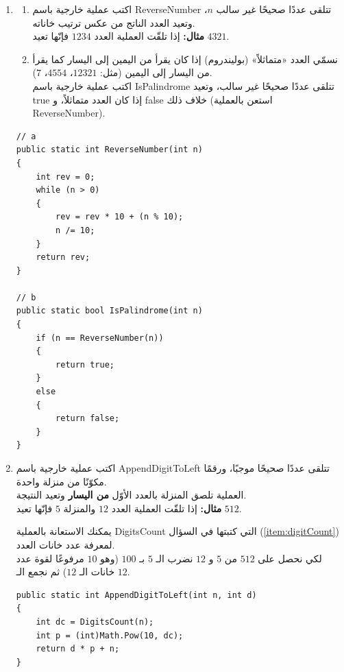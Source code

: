 \documentclass[14pt]{extarticle}
\begin{document}
\begin{enumerate}[itemsep=2em]
\item
\begin{enumerate}
    \item اكتب عملية خارجية باسم \textenglish{ReverseNumber} تتلقى عددًا صحيحًا غير سالب $n$، وتعيد العدد الناتج من عكس ترتيب خاناته. \\
    \textbf{مثال:} إذا تلقّت العملية العدد $1234$ فإنّها تعيد $4321$.
    \item نسمّي العدد «متماثلاً» (بوليندروم) إذا كان يقرأ من اليمين إلى اليسار كما يقرأ من اليسار إلى اليمين (مثل: $12321$، $4554$، $7$). \\
    اكتب عملية خارجية باسم \textenglish{IsPalindrome} تتلقى عددًا صحيحًا غير سالب، وتعيد \textenglish{true} إذا كان العدد متماثلاً، و \textenglish{false} خلاف ذلك (استعن بالعملية \textenglish{ReverseNumber}).
\end{enumerate}
\ifwithsols
\begin{boxSolution}
\begin{english}
\begin{verbatim}
// a
public static int ReverseNumber(int n)
{
    int rev = 0;
    while (n > 0)
    {
        rev = rev * 10 + (n % 10);
        n /= 10;
    }
    return rev;
}

// b
public static bool IsPalindrome(int n)
{
    if (n == ReverseNumber(n))
    {
        return true;
    }
    else
    {
        return false;
    }
}
\end{verbatim}
\end{english}
\end{boxSolution}
\fi
\filbreak

\item \label{item:appendDigitToLeft}
اكتب عملية خارجية باسم \textenglish{AppendDigitToLeft} تتلقى عددًا صحيحًا موجبًا، ورقمًا مكوّنًا من منزلة واحدة. \\
العملية تلصق المنزلة بالعدد الأوّل \textbf{من اليسار} وتعيد النتيجة. \\
\textbf{مثال:} إذا تلقّت العملية العدد $12$ والمنزلة $5$ فإنّها تعيد $512$.
\begin{boxHint}
يمكنك الاستعانة بالعملية \textenglish{DigitsCount} التي كتبتها في السؤال (\ref{item:digitCount}) لمعرفة عدد خانات العدد. \\
لكي نحصل على $512$ من $5$ و $12$ نضرب الـ $5$ بـ $100$ (وهو $10$ مرفوعًا لقوة عدد خانات الـ $12$) ثم نجمع الـ $12$.
\end{boxHint}
\ifwithsols
\begin{boxSolution}
\begin{english}
\begin{verbatim}
public static int AppendDigitToLeft(int n, int d)
{
    int dc = DigitsCount(n);
    int p = (int)Math.Pow(10, dc);
    return d * p + n;
}
\end{verbatim}
\end{english}
\end{boxSolution}
\fi
\filbreak

\end{enumerate}
\end{document}
